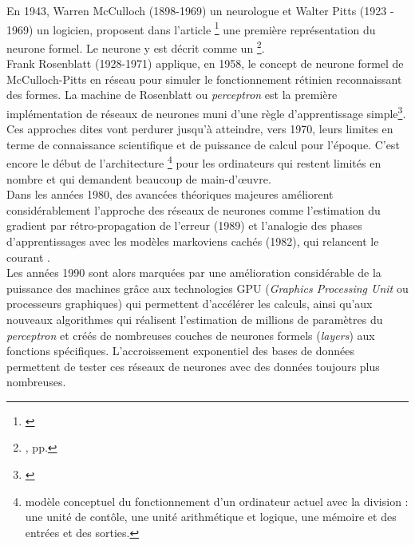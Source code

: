 En 1943, Warren McCulloch (1898-1969) un neurologue et Walter Pitts (1923 - 1969) un logicien, proposent dans l'article \footnote{\cite{mcculloch_logical_1943}} une première représentation du neurone formel. Le neurone y est décrit comme un \footnote{\cite{varela_invitation_1996}, pp.}.\\

Frank Rosenblatt (1928-1971) applique, en 1958, le concept de neurone formel de McCulloch-Pitts en réseau pour simuler le fonctionnement rétinien reconnaissant des formes. La machine de Rosenblatt ou \textit{perceptron} est la première implémentation de réseaux de neurones muni d'une règle d'apprentissage simple\footnote{\cite{rosenblatt_perceptron_1958}}.\\

Ces approches dites  vont perdurer jusqu'à atteindre, vers 1970, leurs limites en terme de connaissance scientifique et de puissance de calcul pour l'époque. C'est encore le début de l'architecture  \footnote{modèle conceptuel du fonctionnement d'un ordinateur actuel avec la division : une unité de contôle, une unité arithmétique et logique, une mémoire et des entrées et des sorties.} pour les ordinateurs qui restent limités en nombre et qui demandent beaucoup de main-d'\oe{}uvre.\\

Dans les années 1980, des avancées théoriques majeures améliorent considérablement l'approche des réseaux de neurones comme l'estimation du gradient par rétro-propagation de l'erreur (1989) et l'analogie des phases d'apprentissages avec les modèles markoviens cachés (1982), qui relancent le courant .\\

Les années 1990 sont alors marquées par une amélioration considérable de la puissance des machines grâce aux technologies GPU (\textit{Graphics Processing Unit} ou processeurs graphiques) qui permettent d'accélérer les calculs, ainsi qu'aux nouveaux algorithmes qui réalisent l'estimation de millions de paramètres du \textit{perceptron} et créés de nombreuses couches de neurones formels (\textit{layers}) aux fonctions spécifiques. L'accroissement exponentiel des bases de données permettent de tester ces réseaux de neurones avec des données toujours plus nombreuses.

